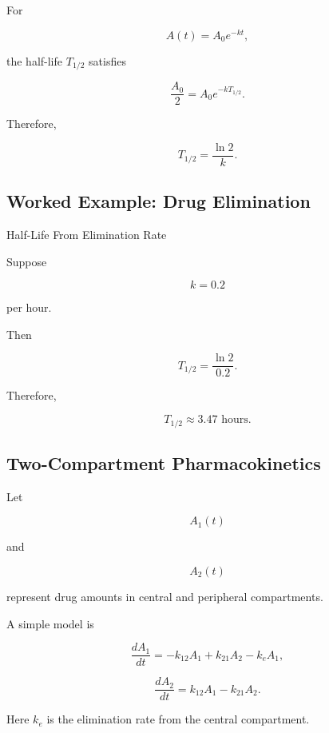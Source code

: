 For

\[
A(t)=A_0e^{-kt},
\]

the half-life \(T_{1/2}\) satisfies

\[
\frac{A_0}{2}
=
A_0e^{-kT_{1/2}}.
\]

Therefore,

\[
\boxed{
T_{1/2}
=
\frac{\ln2}{k}.
}
\]

\subsection{Worked Example: Drug Elimination}
\label{subsec:worked-drug-elimination}

\begin{workedexamplebox}{Half-Life From Elimination Rate}

Suppose

\[
k=0.2
\]

per hour.

Then

\[
T_{1/2}
=
\frac{\ln2}{0.2}.
\]

Therefore,

\begin{answerbox}
\[
\boxed{
T_{1/2}
\approx3.47\text{ hours}.
}
\]
\end{answerbox}

\end{workedexamplebox}

\subsection{Two-Compartment Pharmacokinetics}
\label{subsec:two-compartment-pharmacokinetics}

Let

\[
A_1(t)
\]

and

\[
A_2(t)
\]

represent drug amounts in central and peripheral compartments.

A simple model is

\[
\boxed{
\frac{dA_1}{dt}
=
-k_{12}A_1
+
k_{21}A_2
-
k_eA_1,
}
\]

\[
\boxed{
\frac{dA_2}{dt}
=
k_{12}A_1
-
k_{21}A_2.
}
\]

Here \(k_e\) is the elimination rate from the central compartment.

